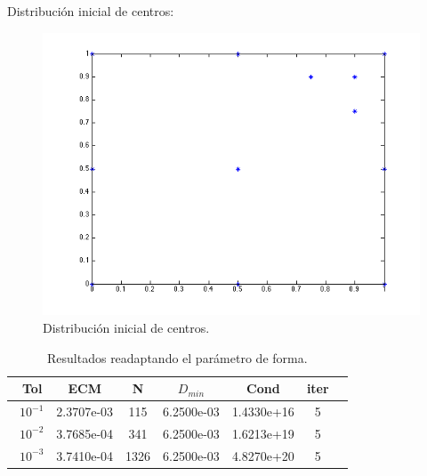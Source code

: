 \documentclass[11pt,a4paper]{article}
\begin{document}
Distribución inicial de centros: 
\begin{figure}[H]
\begin{center}
\includegraphics[scale=.5]{inicial2.png}
\caption{Distribución inicial de centros.}
\end{center}
\end{figure}

\begin{table}[H]
\caption{Resultados readaptando el parámetro de forma.}
\begin{center}
\begin{tabular}{|c|c|c|c|c|c|c|}
\hline
\ Tol & ECM & N & $D_{min}$ & Cond  & iter \\
\hline
\ $10^{-1}$ & 2.3707e-03& 115&6.2500e-03 &1.4330e+16  &  5\\
\ $10^{-2}$ & 3.7685e-04 &341 &6.2500e-03  &1.6213e+19 & 5 \\
\ $10^{-3}$&3.7410e-04 &1326 &6.2500e-03  & 4.8270e+20 &  5 \\

\hline
\end{tabular}
\end{center}
\end{table}
\end{document}
